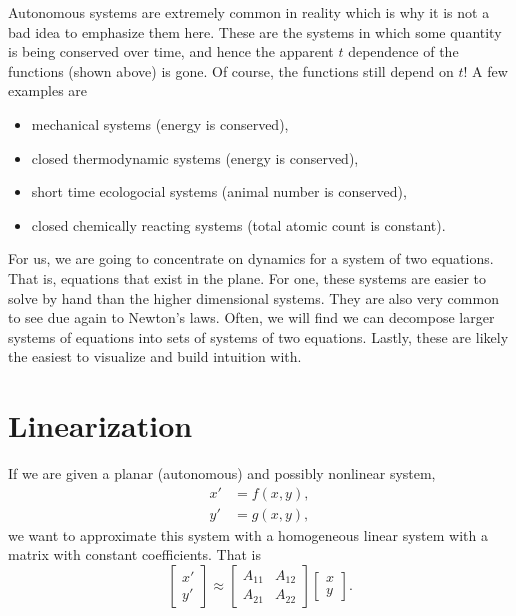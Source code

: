         Autonomous systems are extremely common in reality which is why it is not a bad idea to emphasize them here.  These are the systems in which some quantity is being conserved over time, and hence the apparent $t$ dependence of the functions (shown above) is gone.  Of course, the functions still depend on $t$!  A few examples are
        \begin{itemize}
            \item mechanical systems (energy is conserved),
            \item closed thermodynamic systems (energy is conserved),
            \item short time ecologocial systems (animal number is conserved), 
            \item closed chemically reacting systems (total atomic count is constant).
        \end{itemize}
        
        For us, we are going to concentrate on dynamics for a system of two equations.  That is, equations that exist in the plane.  For one, these systems are easier to solve by hand than the higher dimensional systems.  They are also very common to see due again to Newton's laws.  Often, we will find we can decompose larger systems of equations into sets of systems of two equations. Lastly, these are likely the easiest to visualize and build intuition with.  
        
        \section{Linearization}
        If we are given a planar (autonomous) and possibly nonlinear system, 
        \begin{align*}
            x'&= f(x,y),\\
            y'&= g(x,y),
        \end{align*}
        we want to approximate this system with a homogeneous linear system with a matrix with constant coefficients.  That is
        \[
        \begin{bmatrix} x' \\ y' \end{bmatrix} \approx \begin{bmatrix} A_{11} & A_{12} \\ A_{21} & A_{22} \end{bmatrix} \begin{bmatrix} x \\ y \end{bmatrix}.
        \]
    
